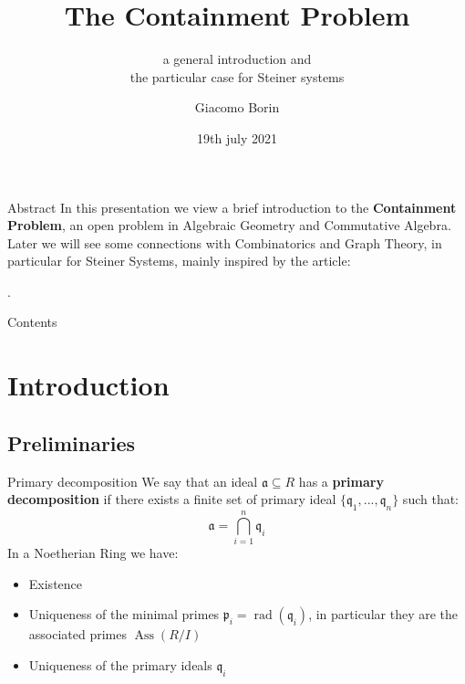 \documentclass{beamer}
\title{The Containment Problem}
\subtitle{a general introduction and 
\\the particular case for Steiner systems}
\author{Giacomo Borin}
\institute{Università di Trento}
\date{19th july 2021}
\theoremstyle{plain}
\theoremstyle{remark}
\theoremstyle{definition}
\newtheorem{deff}[teo]{Definiton}
\newcommand{\p}{\mathfrak{p}}
\newcommand{\q}{\mathfrak{q}}
\newcommand{\A}{\mathfrak{a}}
\DeclareMathOperator{\rad}{rad}
\DeclareMathOperator{\Ann}{Ann}
\DeclareMathOperator{\Ass}{Ass}
\begin{document}
\begin{frame}
  \titlepage
\end{frame}

\begin{frame}[fragile]{Abstract}
In this presentation we view a brief introduction to the \textbf{Containment Problem}, an open problem in Algebraic Geometry and Commutative Algebra.\\
Later we will see some connections with Combinatorics and Graph Theory, in particular for Steiner Systems, mainly inspired by the article: \\
\begin{exampleblock}{}
.
\end{exampleblock}
\end{frame}

\begin{frame}{Contents}
  \tableofcontents
\end{frame}

\section{Introduction}

\subsection{Preliminaries}

%
%


\begin{frame}{Primary decomposition}
We say that an ideal $ \A \subseteq R $ has a \textbf{primary decomposition}  if there exists a finite set of primary ideal $ \{ \q_1 , ... , \q_n\} $ such that:
\begin{equation*}
	\A = \bigcap_{i=1}^n \q_i
\end{equation*}\pause
In a Noetherian Ring we have:
\begin{itemize}
\item Existence
\item Uniqueness of the minimal primes $ \p_i = \rad(\q_i)$, in particular they are the associated primes $ \Ass(R/I) $
\item Uniqueness of the primary ideals $ \q_i $
\end{itemize}
\end{frame}
\end{document}
